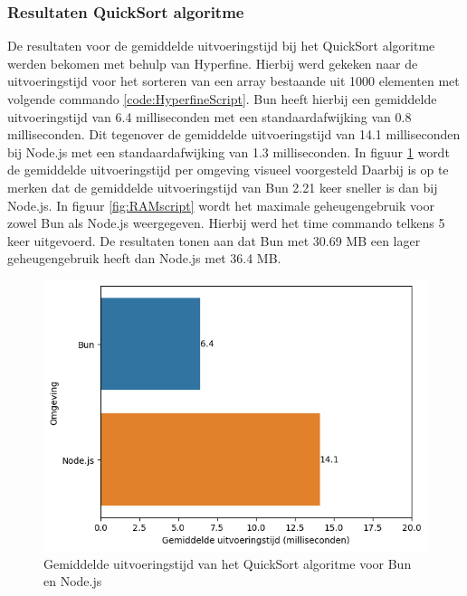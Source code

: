 \subsubsection{Resultaten  QuickSort algoritme}
De resultaten voor de gemiddelde uitvoeringstijd bij het QuickSort algoritme werden bekomen met behulp van Hyperfine.
Hierbij werd gekeken naar de uitvoeringstijd voor het sorteren van een array bestaande uit 1000 elementen met volgende commando \ref{code:HyperfineScript}.
Bun heeft hierbij een gemiddelde uitvoeringstijd van 6.4 milliseconden met een standaardafwijking van 0.8 milliseconden. 
Dit tegenover de gemiddelde uitvoeringstijd van 14.1 milliseconden bij Node.js met een standaardafwijking van 1.3 milliseconden.
In figuur \ref{fig:uitvoeringstijdscript} wordt de gemiddelde uitvoeringstijd per omgeving visueel voorgesteld
Daarbij is op te merken dat de gemiddelde uitvoeringstijd van Bun 2.21 keer sneller is dan bij Node.js.
In figuur \ref{fig:RAMscript} wordt het maximale geheugengebruik voor zowel Bun als Node.js weergegeven. 
Hierbij werd het time commando telkens 5 keer uitgevoerd.
De resultaten tonen aan dat Bun met 30.69 MB een lager geheugengebruik heeft dan Node.js met 36.4 MB.
\begin{figure}[H]
  \centering
  \includegraphics{graphics/scriptuitvoeringstijd.png}
  \caption[Uitvoeringstijd QuickSort algoritme]{\label{fig:uitvoeringstijdscript}Gemiddelde uitvoeringstijd van het QuickSort algoritme voor Bun en Node.js}
\end{figure}

